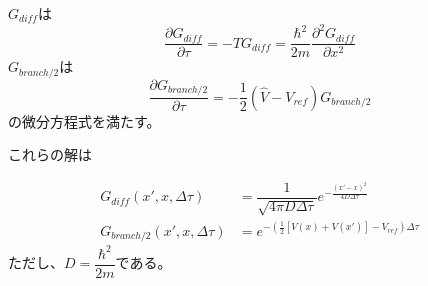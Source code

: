 \documentclass[dvipdfmx]{beamer}
\begin{document}
    \begin{frame}
        $G_{diff}$は
        \begin{equation}
            \dfrac{\partial G_{diff}}{\partial \tau} = - \hat{T}G_{diff} = \dfrac{\hbar^2}{2m}\dfrac{\partial^2 G_{diff}}{\partial x^2}
        \end{equation}
        $G_{branch/2}$は
        \begin{equation}
            \dfrac{\partial G_{branch/2}}{\partial \tau} = -\dfrac{1}{2}(\hat{V} - V_{ref})G_{branch/2}
        \end{equation}
        の微分方程式を満たす。

        これらの解は

        \begin{align}
            G_{diff}(x',x,\Delta\tau) &= \dfrac{1}{\sqrt{4\pi D\Delta\tau}}
            e^{-\frac{(x'-x)^2}{4D\Delta\tau}} \\
            G_{branch/2}(x',x,\Delta\tau) &= e^{-(\frac{1}{2}[V(x)+V(x')]-V_{ref})\Delta\tau}
        \end{align}
        ただし、$D=\dfrac{\hbar^2}{2m}$である。
    \end{frame}
\end{document}
